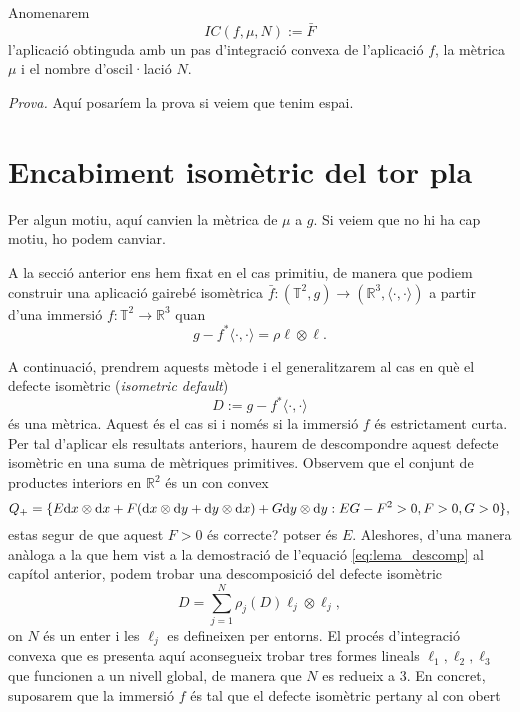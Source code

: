 \begin{nota}
    Anomenarem 
    \begin{equation*}
        IC(f,\mu,N):=\bar F
    \end{equation*}
    l'aplicació obtinguda amb un pas d'integració convexa de l'aplicació $f$, la mètrica $\mu$ i el nombre d'oscil·lació $N$.
\end{nota}
{
\color{green!50!black}
\textit{Prova.} Aquí posaríem la prova si veiem que tenim espai.


}
\section{Encabiment isomètric del tor pla}
{
\color{blue} Per algun motiu, aquí canvien la mètrica de $\mu$ a $g$. Si veiem que no hi ha cap motiu, ho podem canviar.
}

A la secció anterior ens hem fixat en el cas primitiu, de manera que podiem construir una aplicació gairebé isomètrica $\bar f:(\mathbb T^2, g)\to(\mathbb R^3, \langle\cdot, \cdot\rangle)$ a partir d'una immersió $f:\mathbb T^2\to\mathbb R^3$ quan
\begin{equation*}
    g - f^*\langle\cdot, \cdot\rangle = \rho\ell\otimes\ell.
\end{equation*}

A continuació, prendrem aquests mètode i el generalitzarem al cas en què el defecte isomètric (\textit{isometric default}) 
\begin{equation*}
    D:=g-f^*\langle\cdot, \cdot\rangle
\end{equation*}
és una mètrica. Aquest és el cas si i només si la immersió $f$ és estrictament curta. Per tal d'aplicar els resultats anteriors, haurem de descompondre aquest defecte isomètric en una suma de mètriques primitives. Observem que el conjunt de productes interiors en $\mathbb R^2$ és un con convex
\begin{equation*}
    Q_+ = \{E\text dx\otimes\text dx + F(\text dx\otimes\text dy + \text dy\otimes\text dx) + G\text dy\otimes\text dy : EG-F^2>0, F>0, G>0\},
\end{equation*}
{\color{blue} estas segur de que aquest $F>0$ és correcte? potser és $E$.}
Aleshores, d'una manera anàloga a la que hem vist a la demostració de l'equació \ref{eq:lema_descomp} al capítol anterior, podem trobar una descomposició del defecte isomètric
\begin{equation*}
    D = \sum_{j=1}^N \rho_j(D) \ell_j\otimes\ell_j,
\end{equation*}
on $N$ és un enter i les $\ell_j$ es defineixen per entorns. El procés d'integració convexa que es presenta aquí aconsegueix trobar tres formes lineals $\ell_1, \ell_2, \ell_3$ que funcionen a un nivell global, de manera que $N$ es redueix a $3$.
En concret, suposarem que la immersió $f$ és tal que el defecte isomètric pertany al con obert

